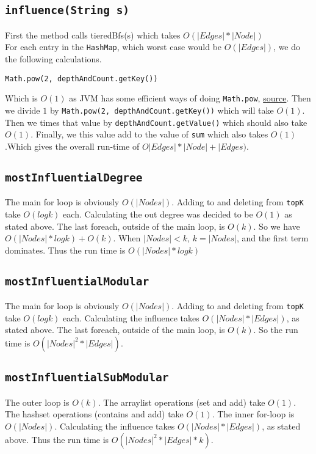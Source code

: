 \documentclass[10pt,letterpaper]{article}
\begin{document}
\subsection{\texttt{influence(String s)}}
First the method calls tieredBfs(s) which takes $O(|Edges| * |Node|)$\\
For each entry in the \texttt{HashMap}, which worst case would be $O(|Edges|)$, we do the following calculations.

\begin{verbatim}
Math.pow(2, depthAndCount.getKey()) 
\end{verbatim}
Which is $O(1)$ as JVM has some efficient ways of doing \texttt{Math.pow}, \href{https://stackoverflow.com/a/32419139/749721}{source}.
Then we divide $1$ by \texttt{Math.pow(2, depthAndCount.getKey())} which will
take $O(1)$. Then we times that value by \texttt{depthAndCount.getValue()} which should also take $O(1)$. Finally, we this value add to the value of \texttt{sum} which also takes $O(1)$.Which gives the overall run-time of $O|Edges| * |Node| + |Edges)$.\subsection{\texttt{mostInfluentialDegree}}
The main for loop is obviously $O(|Nodes|)$. Adding to and deleting from \texttt{topK} take $O(log k)$ each. Calculating the out degree was decided to be $O(1)$ as stated above. The last foreach, outside of the main loop, is $O(k)$. So we have $O(|Nodes|*log k)+O(k)$. When $|Nodes|<k$, $k=|Nodes|$, and the first term dominates. Thus the run time is $O(|Nodes|*log k)$
\subsection{\texttt{mostInfluentialModular}}
The main for loop is obviously $O(|Nodes|)$. Adding to and deleting from \texttt{topK} take $O(log k)$ each. Calculating the influence takes $O(|Nodes|*|Edges|)$, as stated above. The last foreach, outside of the main loop, is $O(k)$. So the run time is $O(|Nodes|^2*|Edges|)$.
\subsection{\texttt{mostInfluentialSubModular}}
The outer loop is $O(k)$. The arraylist operations (set and add) take $O(1)$. The hashset operations (contains and add) take $O(1)$. The inner for-loop is $O(|Nodes|)$. Calculating the influence takes $O(|Nodes|*|Edges|)$, as stated above. Thus the run time is $O(|Nodes|^2*|Edges|*k)$.
\end{document}
